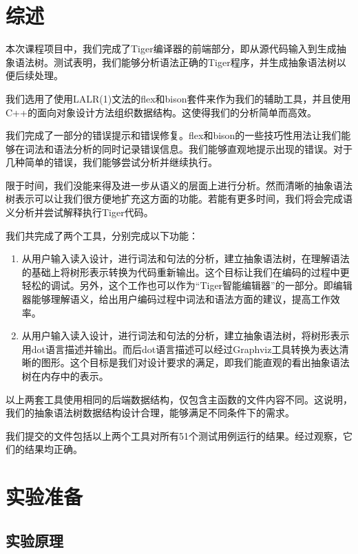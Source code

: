 



\section{综述}

本次课程项目中，我们完成了Tiger编译器的前端部分，即从源代码输入到生成抽象语法树。测试表明，我们能够分析语法正确的Tiger程序，并生成抽象语法树以便后续处理。

我们选用了使用LALR(1)文法的flex和bison套件来作为我们的辅助工具，并且使用C++的面向对象设计方法组织数据结构。这使得我们的分析简单而高效。

我们完成了一部分的错误提示和错误修复。flex和bison的一些技巧性用法让我们能够在词法和语法分析的同时记录错误信息。我们能够直观地提示出现的错误。对于几种简单的错误，我们能够尝试分析并继续执行。

限于时间，我们没能来得及进一步从语义的层面上进行分析。然而清晰的抽象语法树表示可以让我们很方便地扩充这方面的功能。若能有更多时间，我们将会完成语义分析并尝试解释执行Tiger代码。

我们共完成了两个工具，分别完成以下功能：

\begin{enumerate}
\item 从用户输入读入设计，进行词法和句法的分析，建立抽象语法树，在理解语法的基础上将树形表示转换为代码重新输出。这个目标让我们在编码的过程中更轻松的调试。另外，这个工作也可以作为“Tiger智能编辑器”的一部分。即编辑器能够理解语义，给出用户编码过程中词法和语法方面的建议，提高工作效率。
\item 从用户输入读入设计，进行词法和句法的分析，建立抽象语法树，将树形表示用dot语言描述并输出。而后dot语言描述可以经过Graphviz工具转换为表达清晰的图形。这个目标是我们对设计要求的满足，即我们能直观的看出抽象语法树在内存中的表示。

\end{enumerate}

以上两套工具使用相同的后端数据结构，仅包含主函数的文件内容不同。这说明，我们的抽象语法树数据结构设计合理，能够满足不同条件下的需求。

我们提交的文件包括以上两个工具对所有51个测试用例运行的结果。经过观察，它们的结果均正确。

\section{实验准备}

\subsection{实验原理}

